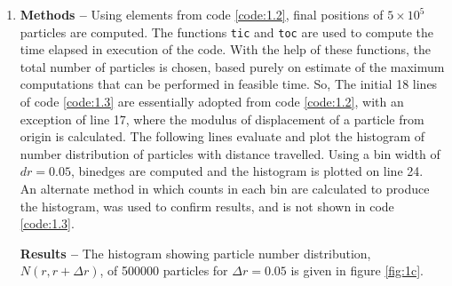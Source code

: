 \documentclass[a4paper]{article}
\begin{document}
\begin{enumerate} [label*=\textbf{(\alph*)}]
				\subitem \textbf{Results --} 
					A scatter plot of final positions after 2000 time steps, of 2000 particles undergoing two dimensional random walk is shown in figure \ref{fig:1b}. 
				
			
			
			\item 
				\subitem \textbf{Methods  --} 
					Using elements from code \ref{code:1.2}, final positions of \(5 \times 10^{5}\) particles are computed. The functions \texttt{tic} and \texttt{toc} are used to compute the time elapsed in execution of the code. With the help of these functions, the total number of particles is chosen, based purely on estimate of the maximum computations that can be performed in feasible time. So, The initial 18 lines of code \ref{code:1.3} are essentially adopted from code \ref{code:1.2}, with an exception of line 17, where the modulus of displacement of a particle from origin is calculated. The following lines evaluate and plot the histogram of number distribution of particles with distance travelled. Using a bin width of \(dr=0.05\), binedges are computed and the histogram is plotted on line 24.\\
					An alternate method in which counts in each bin are calculated to produce the histogram, was used to confirm results, and is not shown in code \ref{code:1.3}. 
					
					\begin{figure} [h]
						
					\end{figure}
					
				\subitem \textbf{Results --}
					The histogram showing particle number distribution, \(N(r,r+\Delta r)\), of 500000 particles for \(\Delta r = 0.05\) is given in figure \ref{fig:1c}. 
				
				
			

\end{enumerate}
\end{document}
